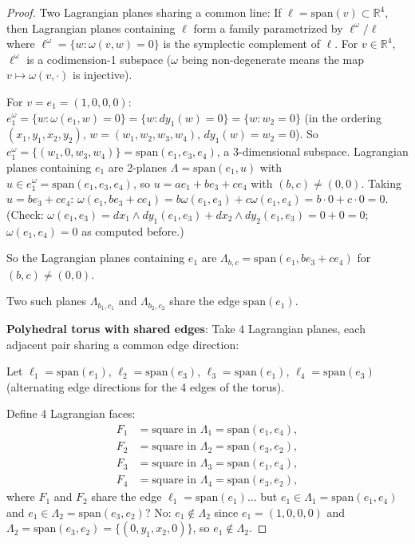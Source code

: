 \documentclass[12pt]{article}
\theoremstyle{definition}
\begin{document}
\begin{proof}
Two Lagrangian planes sharing a common line: If $\ell = \mathrm{span}(v)\subset\mathbb{R}^4$, then Lagrangian planes containing $\ell$ form a family parametrized by $\ell^\omega/\ell$ where $\ell^\omega = \{w : \omega(v,w) = 0\}$ is the symplectic complement of $\ell$. For $v\in\mathbb{R}^4$, $\ell^\omega$ is a codimension-1 subspace ($\omega$ being non-degenerate means the map $v\mapsto\omega(v,\cdot)$ is injective).

For $v = e_1 = (1,0,0,0)$: $e_1^\omega = \{w : \omega(e_1,w) = 0\} = \{w : dy_1(w) = 0\} = \{w : w_2 = 0\}$ (in the ordering $(x_1,y_1,x_2,y_2)$, $w = (w_1,w_2,w_3,w_4)$, $dy_1(w) = w_2 = 0$). So $e_1^\omega = \{(w_1,0,w_3,w_4)\} = \mathrm{span}(e_1,e_3,e_4)$, a 3-dimensional subspace. Lagrangian planes containing $e_1$ are 2-planes $\Lambda = \mathrm{span}(e_1, u)$ with $u\in e_1^\omega = \mathrm{span}(e_1,e_3,e_4)$, so $u = ae_1+be_3+ce_4$ with $(b,c)\neq(0,0)$. Taking $u = be_3+ce_4$: $\omega(e_1, be_3+ce_4) = b\omega(e_1,e_3)+c\omega(e_1,e_4) = b\cdot 0 + c\cdot 0 = 0$. (Check: $\omega(e_1,e_3) = dx_1\wedge dy_1(e_1,e_3)+dx_2\wedge dy_2(e_1,e_3) = 0+0 = 0$; $\omega(e_1,e_4) = 0$ as computed before.)

So the Lagrangian planes containing $e_1$ are $\Lambda_{b,c} = \mathrm{span}(e_1, be_3+ce_4)$ for $(b,c)\neq(0,0)$.

Two such planes $\Lambda_{b_1,c_1}$ and $\Lambda_{b_2,c_2}$ share the edge $\mathrm{span}(e_1)$.

\textbf{Polyhedral torus with shared edges}: Take 4 Lagrangian planes, each adjacent pair sharing a common edge direction:

Let $\ell_1 = \mathrm{span}(e_1)$, $\ell_2 = \mathrm{span}(e_3)$, $\ell_3 = \mathrm{span}(e_1)$, $\ell_4 = \mathrm{span}(e_3)$ (alternating edge directions for the 4 edges of the torus).

Define 4 Lagrangian faces:
\begin{align*}
F_1 &= \text{square in }\Lambda_1 = \mathrm{span}(e_1, e_4),\\
F_2 &= \text{square in }\Lambda_2 = \mathrm{span}(e_3, e_2),\\
F_3 &= \text{square in }\Lambda_3 = \mathrm{span}(e_1, e_4),\\
F_4 &= \text{square in }\Lambda_4 = \mathrm{span}(e_3, e_2),
\end{align*}
where $F_1$ and $F_2$ share the edge $\ell_1 = \mathrm{span}(e_1)$... but $e_1\in\Lambda_1 = \mathrm{span}(e_1,e_4)$ and $e_1\in\Lambda_2 = \mathrm{span}(e_3,e_2)$? No: $e_1\notin\Lambda_2$ since $e_1 = (1,0,0,0)$ and $\Lambda_2 = \mathrm{span}(e_3,e_2) = \{(0,y_1,x_2,0)\}$, so $e_1\notin\Lambda_2$.


\end{proof}
\end{document}
